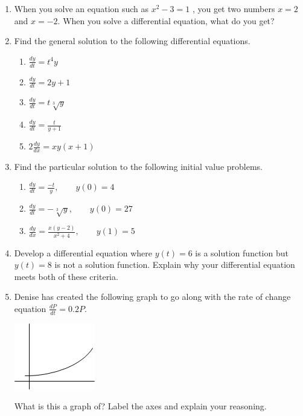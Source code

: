 \begin{enumerate}

\item When you solve an equation such as $x^2-3=1$ , you get two numbers $x=2$ and $x= -2$.  When you solve a differential equation, what do you get? \label{03HWproblem1}

\item Find the general solution to the following differential equations. \label{03HWproblem2}

\begin{enumerate}
\item $\displaystyle \frac{dy}{dt}=t^4y$
\item $\displaystyle \frac{dy}{dt}=2y+1$
\item $\displaystyle \frac{dy}{dt}=t\sqrt[3]{y}$
\item $\displaystyle \frac{dy}{dt}=\frac{t}{y+1}$
 \item $\displaystyle 2\frac{dy}{dx}=xy(x+1)$
\end{enumerate}
	 
\item	Find the particular solution to the following initial value problems. \label{03HWproblem3}
\begin{enumerate}
\item $\displaystyle \frac{dy}{dt}=\frac{-t}{y}, \qquad y(0)=4$
\item $\displaystyle \frac{dy}{dt}=-\sqrt[3]{y}, \qquad y(0)=27$
\item $\displaystyle \frac{dy}{dx}=\frac{x(y-2)}{x^2+4}, \qquad y(1)=5$
\end{enumerate}
	 
\item	Develop a differential equation where $y(t) = 6$ is a solution function but $y(t) = 8$ is not a solution function. Explain why your differential equation meets both of these criteria. \label{03HWproblem4}

\item Denise has created the following graph to go along with the rate of change equation $\frac{dP}{dt}=0.2P$. \label{03HWproblem5}
\begin{center}
\includegraphics[]{03/03Denise.png}
\end{center}
What is this a graph of? Label the axes and explain your reasoning.


\end{enumerate}
